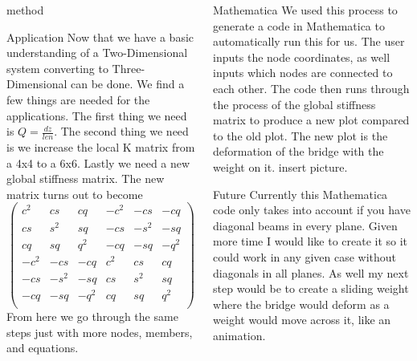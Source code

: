 \documentclass[final]{beamer}
\newlength{\onecolwid}
\newlength{\twocolwid}
\begin{document}
\begin{frame}[t]
\begin{columns}[t]
\begin{column}{\twocolwid}
\begin{block}{method}
\end{block}



\begin{alertblock}{Application}
Now that we have a basic understanding of a Two-Dimensional system converting to Three-Dimensional can be done. We find a few things are needed for the applications. The first thing we need is $Q = \frac{dz}{len}$. The second thing we need is we increase the local K matrix from a 4x4 to a 6x6. Lastly we need a new global stiffness matrix. The new matrix turns out to become 
$$
\begin{pmatrix}
c^2 & cs & cq & -c^2 & -cs & -cq\\
cs & s^2 & sq & -cs & -s^2 & -sq\\
cq & sq & q^2 & -cq & -sq & -q^2\\
-c^2 & -cs & -cq & c^2 & cs & cq\\
-cs & -s^2 & -sq & cs & s^2 & sq\\
-cq & -sq & -q^2 & cq & sq & q^2\\
\end{pmatrix}
$$
From here we go through the same steps just with more nodes, members, and equations.
\end{alertblock}
\end{column}

\begin{column}{\onecolwid} %


\begin{alertblock}{Mathematica}
We used this process to generate a code in Mathematica to automatically run this for us. The user inputs the node coordinates, as well inputs which nodes are connected to each other. The code then runs through the process of the global stiffness matrix to produce a new plot compared to the old plot. The new plot is the deformation of the bridge with the weight on it. {insert picture}. 



\end{alertblock}

\begin{block}{Future}
Currently this Mathematica code only takes into account if you have diagonal beams in every plane. Given more time I would like to create it so it could work in any given case without diagonals in all planes. As well my next step would be to create a sliding weight where the bridge would deform as a weight would move across it, like an animation. 
\end{block}


\end{column}
\end{columns}
\end{frame}
\end{document}
